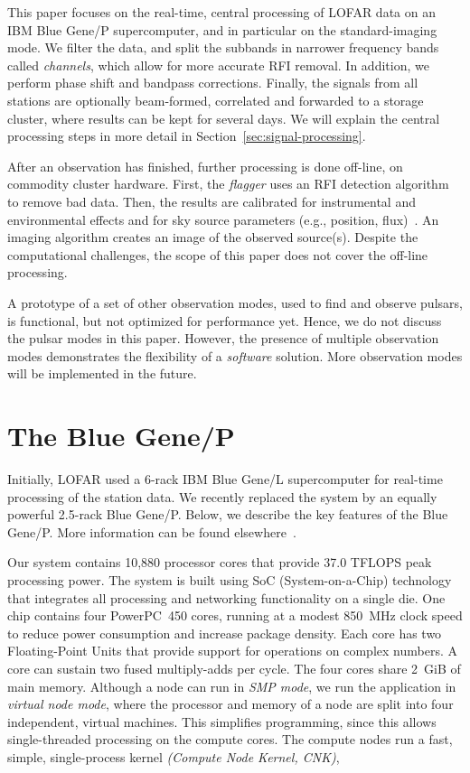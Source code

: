 \documentclass{sig-alternate}
\begin{document}
This paper focuses on the real-time, central processing of LOFAR data on
an IBM Blue Gene/P supercomputer, and in particular on the standard-imaging
mode.
We filter the data, and split the subbands in narrower frequency bands called
\emph{channels}, which allow for more accurate RFI removal.
In addition, we perform phase shift and bandpass corrections.
Finally, the signals from all stations are optionally beam-formed,
correlated and forwarded to a storage cluster, where results can be
kept for several days.  We will explain the central processing steps
in more detail in Section~\ref{sec:signal-processing}.

After an observation has finished, further processing is done off-line, on
commodity cluster hardware. 
First, the \emph{flagger\/} uses an RFI detection algorithm to remove bad data.
Then, the results are calibrated for instrumental and environmental effects and
for sky source parameters (e.g., position, flux)~\cite{Nijboer:07}.
An imaging algorithm creates an image of the observed source(s).
Despite the computational challenges, the scope of this paper does not cover
the off-line processing.

A prototype of a set of other observation modes, used to find and observe
pulsars, is functional, but not optimized for performance yet.
Hence, we do not discuss the pulsar modes in this paper.
However, the presence of multiple observation modes demonstrates the
flexibility of a \emph{software\/} solution.
More observation modes will be implemented in the future.


\section{The Blue Gene/P}
\label{sec:BG/P}

Initially, LOFAR used a 6-rack IBM Blue Gene/L supercomputer for real-time
processing of the station data.
We recently replaced the system by an equally powerful 2.5-rack Blue Gene/P.
Below, we describe the key features of the Blue Gene/P.
More information can be found elsewhere~\cite{IBM:08}.

Our system contains 10,880 processor cores that provide 37.0 TFLOPS peak
processing power.
The system is built using SoC (System-on-a-Chip) technology that integrates
all processing and networking functionality on a single die.
One chip contains four PowerPC~450 cores, running at a modest 850~MHz clock
speed to reduce power consumption and increase package density.
Each core has two Floating-Point Units that provide support for
operations on complex numbers.
A core can sustain two fused multiply-adds per cycle.
The four cores share 2~GiB of main memory.
Although a node can run in \emph{SMP mode}, we run the application in
\emph{virtual node mode}, where the processor and memory of a node are split
into four independent, virtual machines.
This simplifies programming, since this allows single-threaded processing
on the compute cores.  %
The compute nodes run a fast, simple, single-process kernel
\emph{(Compute Node Kernel, CNK)},
\end{document}
